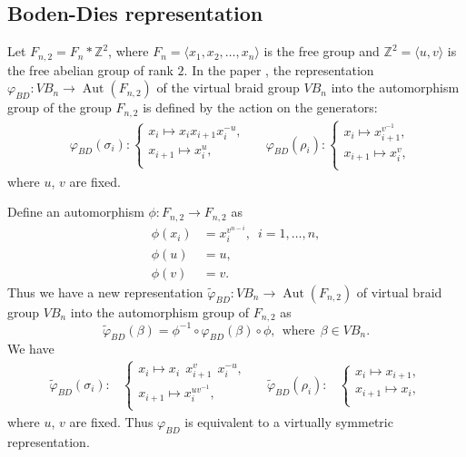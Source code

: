 \documentclass[11 pt, reqno]{amsart}
\theoremstyle{definition}
\numberwithin{equation}{subsection}
\newcommand{\Aut}{\operatorname{Aut}}
\begin{document}


\subsection{Boden-Dies representation}\label{SS: Boden-Dies representation}
Let $F_{n,2} = F_n \ast \mathbb{Z}^2$, where $F_n=\langle x_1, x_2, \ldots,x_n \rangle$ is the free group and
$\mathbb{Z}^2 = \langle u, v \rangle$ is the free abelian group of rank $2$.
In the paper \cite{BDGGHN-1}, the representation  $\varphi_{BD}: VB_n \rightarrow \Aut(F_{n,2})$
of the virtual braid group $VB _n$ into the automorphism group of the group $F_{n,2}$ is defined by the action on the generators:
\begin{align*}
&\varphi_{BD}(\sigma_i) :
\left\{
\begin{array}{l}
  x_i \mapsto  x_i x_{i+1} x_i^{-u}, \\
  x_{i+1} \mapsto x_i^{u},  \\
\end{array}
\right.~~~
&\varphi_{BD}(\rho_i) :
\left\{
\begin{array}{l}
  x_i \mapsto  x_{i+1}^{v^{-1}}, \\
  x_{i+1} \mapsto x_i^{v},  \\
\end{array}
\right.
\end{align*}
where $u$, $v$ are fixed.

Define an automorphism $\phi: F_{n,2} \to F_{n,2}$ as
\begin{align*}
\phi(x_i)&=x_i ^{v^{n-i}},\,\,\, i=1,\ldots,n,\\
\phi(u)&=u,\\
\phi(v)&=v.
\end{align*}
Thus we have a new representation $\tilde{\varphi}_{BD}: VB_n \to \Aut(F_{n,2})$ of virtual braid group $VB_n$ into the automorphism group of $F_{n,2}$ as
$$
\tilde{\varphi}_{BD}(\beta)=\phi^{-1} \circ \varphi_{BD}(\beta) \circ \phi, ~~\textrm{where}~~ \beta \in VB_n.
$$
We have
\begin{align*}
\tilde{\varphi}_{BD}(\sigma_i) :&
\left\{
\begin{array}{l}
  x_i \mapsto  x_i ~~x_{i+1}^{v}~~ x_i^{-u}, \\
  x_{i+1} \mapsto x_i^{uv^{-1}},  \\
\end{array}
\right.~~~
&\tilde{\varphi}_{BD}(\rho_i) :&
\left\{
\begin{array}{l}
  x_i \mapsto  x_{i+1}, \\
  x_{i+1} \mapsto x_i,  \\
\end{array}
\right.
\end{align*}
where $u$, $v$ are fixed. Thus $\varphi_{BD}$ is equivalent to a virtually symmetric representation.
\end{document}

